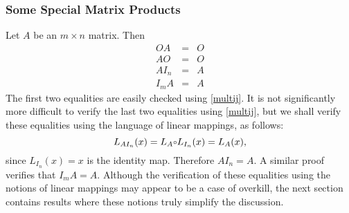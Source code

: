 \documentclass{ximera}
\begin{document}
\subsubsection*{Some Special Matrix Products}

Let $A$ be an $m\times n$ matrix.  Then
\begin{eqnarray*}
OA & = & O \\
AO & = & O \\
AI_n & = & A \\
I_mA & = & A
\end{eqnarray*}
The first two equalities are easily checked using \eqref{multij}.
It is not significantly more difficult to verify the last two
equalities using \eqref{multij}, but we shall verify these
equalities using the language of linear mappings, as follows:
\[
L_{AI_n}(x)=L_A\compose L_{I_n}(x)=L_A(x),
\]
since $L_{I_n}(x)=x$ is the identity map.  Therefore $AI_n=A$.
A similar proof verifies that $I_mA=A$.  Although the
verification of these equalities using the notions of linear
mappings may appear to be a case of overkill, the next section
contains results where these notions truly simplify the discussion.

\EXER

\TEXER
\end{document}
